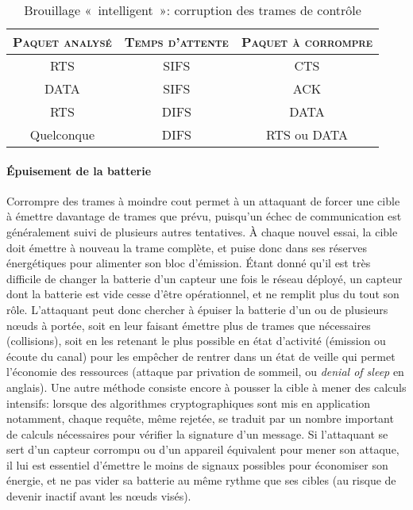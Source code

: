 \begin{table}[!ht]
    \caption{Brouillage « intelligent »: corruption des trames de contrôle}\label{ea:tab:smartjam}
    \centering
    \medskip
    \begin{tabular}{c c c}
        \toprule
        \textsc{Paquet analysé} & \textsc{Temps d'attente} & \textsc{Paquet à corrompre}\\
        \midrule
        RTS & SIFS & CTS\\
        DATA & SIFS & ACK\\
        RTS & DIFS & DATA\\
        Quelconque & DIFS & RTS ou DATA\\
        \bottomrule
    \end{tabular}
\end{table}

        \paragraph{Épuisement de la batterie}
Corrompre des trames à moindre cout permet à un attaquant de forcer une cible à émettre davantage de trames que prévu, puisqu'un échec de communication est généralement suivi de plusieurs autres tentatives.
À chaque nouvel essai, la cible doit émettre à nouveau la trame complète, et puise donc dans ses réserves énergétiques pour alimenter son bloc d'émission.
Étant donné qu'il est très difficile de changer la batterie d'un capteur une fois le réseau déployé, un capteur dont la batterie est vide cesse d'être opérationnel, et ne remplit plus du tout son rôle.
L'attaquant peut donc chercher à épuiser la batterie d'un ou de plusieurs nœuds à portée, soit en leur faisant émettre plus de trames que nécessaires (collisions), soit en les retenant le plus possible en état d'activité (émission ou écoute du canal) pour les empêcher de rentrer dans un état de veille qui permet l'économie des ressources (attaque par privation de sommeil, ou \textit{denial of sleep} en anglais).
Une autre méthode consiste encore à pousser la cible à mener des calculs intensifs: lorsque des algorithmes cryptographiques sont mis en application notamment, chaque requête, même rejetée, se traduit par un nombre important de calculs nécessaires pour vérifier la signature d'un message.
Si l'attaquant se sert d'un capteur corrompu ou d'un appareil équivalent pour mener son attaque, il lui est essentiel d'émettre le moins de signaux possibles pour économiser son énergie, et ne pas vider sa batterie au même rythme que ses cibles (au risque de devenir inactif avant les nœuds visés).

